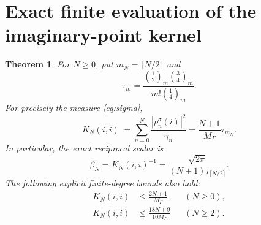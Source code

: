 \documentclass[11pt]{article}
\newtheorem{theorem}{Theorem}
\begin{document}
\section{Exact finite evaluation of the imaginary-point kernel}

\begin{theorem}\label{thm:kernel}
For $N\ge0$, put $m_N=\lceil N/2\rceil$ and
\[
 \tau_m=\frac{(\tfrac12)_m(\tfrac34)_m}{m!(\tfrac14)_m}.
\]
For precisely the measure \eqref{eq:sigma},
\begin{equation}\label{eq:exactkernel}
 \boxed{K_N(i,i):=\sum_{n=0}^N\frac{|p_n^\sigma(i)|^2}{\gamma_n}
       =\frac{N+1}{M_\Gamma}\tau_{m_N}.}
\end{equation}
In particular, the exact reciprocal scalar is
\begin{equation}\label{eq:beta}
 \boxed{\beta_N=K_N(i,i)^{-1}
 =\frac{\sqrt{2\pi}}{(N+1)\tau_{\lceil N/2\rceil}}.}
\end{equation}
The following explicit finite-degree bounds also hold:
\begin{align}
 K_N(i,i)&\le\frac{2N+1}{M_\Gamma}&& (N\ge0),\label{eq:linear}\\
 K_N(i,i)&\le\frac{18N+9}{10M_\Gamma}&& (N\ge2).\label{eq:betterlinear}
\end{align}
\end{theorem}
\end{document}
